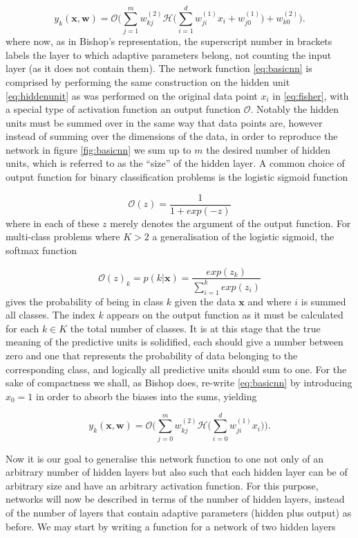 \begin{equation}
y_k(\boldsymbol{x},\boldsymbol{w}) = \mathcal{O} \Bigg( \sum_{j=1}^{m} w_{kj}^{(2)}
\mathcal{H} \Bigg( \sum_{i=1}^{d} w_{ji}^{(1)} x_{i} + w_{j0}^{(1)} \Bigg) + w_{k0}^{(2)} \Bigg).
\label{eq:basicnn}
\end{equation}
where now, as in Bishop's representation, the superscript number in brackets
labels the layer to which adaptive parameters belong, not counting the input
layer (as it does not contain them). The network function \eqref{eq:basicnn} is
comprised by performing the same construction on the hidden unit
\eqref{eq:hiddenunit} as was performed on the original data point $x_i$ in
\eqref{eq:fisher}, with a special type of activation function an output function
$\mathcal{O}$. Notably the hidden units must be summed over in the same way that
data points are, however instead of summing over the dimensions of the data, in
order to reproduce the network in figure \ref{fig:basicnn} we sum up to $m$ the
desired number of hidden units, which is referred to as the ``size'' of the
hidden layer. A common choice of output function for binary classification
problems is the logistic sigmoid function

\begin{equation}
\mathcal{O}(z) = \frac{1}{1 + exp(-z)}
\label{eq:sigmoid}
\end{equation}
where in each of these $z$ merely denotes the argument of the output function.
For multi-class problems where $K > 2$ a generalisation of the logistic sigmoid,
the softmax function

\begin{equation}
\mathcal{O}(z)_k = p(k|\boldsymbol{x}) = \frac{exp(z_k)}{\sum_{i=1}^kexp(z_i)}
\label{eq:softmax}
\end{equation}
gives the probability of being in class $k$ given the data $\boldsymbol{x}$ and
where $i$ is summed all classes. The index $k$ appears on the output function as
it must be calculated for each $k \in K$ the total number of classes. It is at
this stage that the true meaning of the predictive units is solidified, each
should give a number between zero and one that represents the probability of
data belonging to the corresponding class, and logically all predictive units
should sum to one. For the sake of compactness we shall, as Bishop does,
re-write \eqref{eq:basicnn} by introducing $x_{0} = 1$ in order to absorb the
biases into the sums, yielding

\begin{equation}
y_k(\boldsymbol{x},\boldsymbol{w}) = \mathcal{O} \Bigg( \sum_{j=0}^{m} w_{kj}^{(2)}
\mathcal{H} \Bigg( \sum_{i=0}^{d} w_{ji}^{(1)} x_{i} \Bigg) \Bigg).
\label{eq:compactnn}
\end{equation}
\par Now it is our goal to generalise this network function to one not only of
an arbitrary number of hidden layers but also such that each hidden layer can be
of arbitrary size and have an arbitrary activation function. For this purpose,
networks will now be described in terms of the number of hidden layers, instead
of the number of layers that contain adaptive parameters (hidden plus output) as
before. We may start by writing a function for a network of two hidden layers

